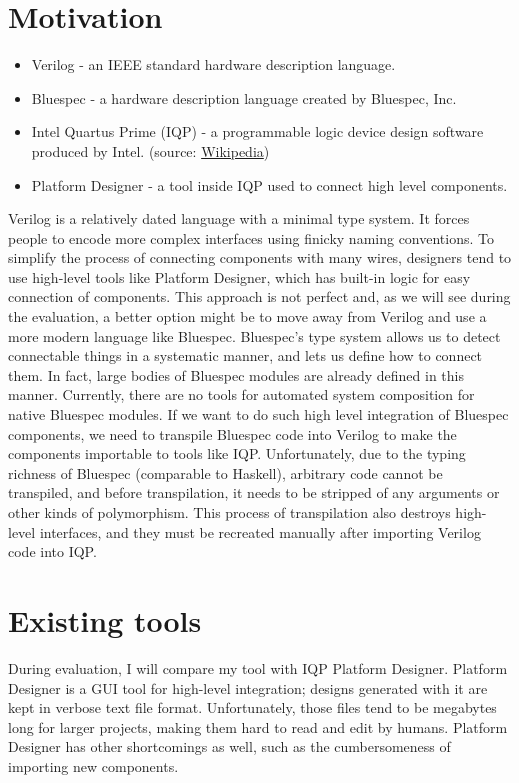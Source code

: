 \documentclass[12pt]{report}
\begin{document}
\section{Motivation}
\begin{tcolorbox}[title=Vocabulary]
    \begin{itemize}
      \item Verilog - an IEEE standard hardware description language.
      \item Bluespec - a hardware description language created by Bluespec, Inc.
      \item Intel Quartus Prime (IQP) - a programmable logic device design software produced by Intel. (source: \href{https://en.wikipedia.org/wiki/Intel_Quartus_Prime}{Wikipedia})
      \item Platform Designer - a tool inside IQP used to connect high level components.
    \end{itemize}
\end{tcolorbox}
Verilog is a relatively dated language with a minimal type system. It forces people to encode more complex interfaces using finicky naming conventions. To simplify the process of connecting components with many wires, designers tend to use high-level tools like Platform Designer, which has built-in logic for easy connection of components. This approach is not perfect and, as we will see during the evaluation, a better option might be to move away from Verilog and use a more modern language like Bluespec. Bluespec's type system allows us to detect connectable things in a systematic manner, and lets us define how to connect them. In fact, large bodies of Bluespec modules are already defined in this manner. Currently, there are no tools for automated system composition for native Bluespec modules. If we want to do such high level integration of Bluespec components, we need to transpile Bluespec code into Verilog to make the components importable to tools like IQP. Unfortunately, due to the typing richness of Bluespec (comparable to Haskell), arbitrary code cannot be transpiled, and before transpilation, it needs to be stripped of any arguments or other kinds of polymorphism. This process of transpilation also destroys high-level interfaces, and they must be recreated manually after importing Verilog code into IQP.

\section{Existing tools}
During evaluation, I will compare my tool with IQP Platform Designer.
Platform Designer is a GUI tool for high-level integration; designs generated with it are kept in verbose text file format. Unfortunately, those files tend to be megabytes long for larger projects, making them hard to read and edit by humans. Platform Designer has other shortcomings as well, such as the cumbersomeness of importing new components.
\end{document}
